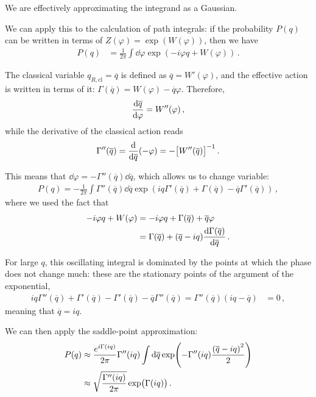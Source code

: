 \documentclass[main.tex]{subfiles}
\begin{document}
We are effectively approximating the integrand as a Gaussian. 

We can apply this to the calculation of path integrals: if the probability \(P(q)\) can be written in terms of \(Z(\varphi ) = \exp(W(\varphi ))\), then we have 
%
\begin{align}
P(q) &= \frac{1}{2 \pi } \int \dd{\varphi } \exp(-i \varphi q + W(\varphi ))
\,.
\end{align}

The classical variable \(q _{R, \text{cl}} = \overline{q}\) is defined as \(\overline{q}= W' (\varphi ) \), and the effective action is written in terms of it: \(\Gamma (\overline{q}) = W(\varphi ) - \overline{q} \varphi \). Therefore, 
%
\begin{align}
\dv{\overline{q}}{\varphi } = W''(\varphi )
\,,
\end{align}
%
while the derivative of the classical action reads 
%
\begin{align}
\Gamma '' (\overline{q})
= \dv{}{\overline{q}}
\qty(- \varphi ) 
= - \qty[W''(\overline{q})]^{-1}
\,.
\end{align}

This means that \(\dd{\varphi } = - \Gamma'' (\overline{q}) \dd{\overline{q}}\), which allows us to change variable: 
%
\begin{align}
P(q) = -\frac{1}{2 \pi } \int \Gamma '' (\overline{q}) \dd{\overline{q}}
\exp( i q \Gamma '(\overline{q}) + \Gamma (\overline{q}) - \overline{q} \Gamma ' (\overline{q}))
\,,
\end{align}
%
where we used the fact that 
%
\begin{align}
- i \varphi q + W(\varphi ) &= - i \varphi q + \Gamma (\overline{q}) + \overline{q} \varphi    \\
&= \Gamma (\overline{q}) + (\overline{q} - iq) \dv{\Gamma (\overline{q})}{\overline{q}}
\,.
\end{align}

For large \(q\), this oscillating integral is dominated by the points at which the phase does not change much: these are the stationary points of the argument of the exponential, 
%
\begin{align}
iq \Gamma'' (\overline{q})  
+ \Gamma '(\overline{q}) - \Gamma '(\overline{q}) - \overline{q} \Gamma '' (\overline{q}) 
=
\Gamma'' (\overline{q}) (iq - \overline{q} )
&= 0
\,,
\end{align}
%
meaning that \(\overline{q} = iq\).

We can then apply the saddle-point approximation: 
%
\begin{align}
P(q) &\approx \frac{e^{i \Gamma (iq)}}{2 \pi } \Gamma '' (iq)
\int \dd{\overline{q}} \exp(- \Gamma ''(iq) \frac{\qty(\overline{q} - iq)^2}{2})  \\
&\approx \sqrt{\frac{\Gamma '' (iq)}{2 \pi }} \exp(\Gamma (iq))
\,.
\end{align}
\end{document}
